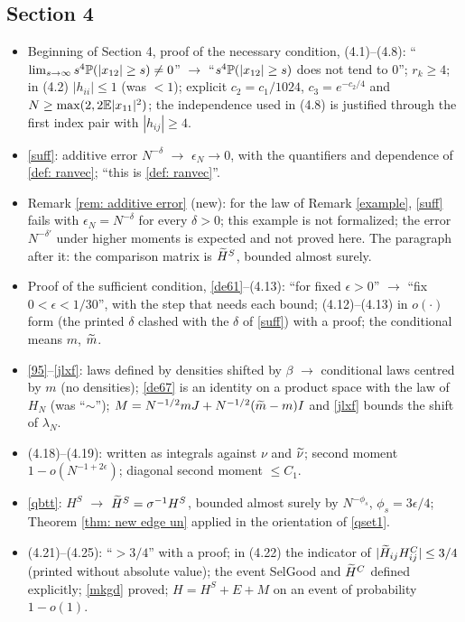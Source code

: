 \subsection*{Section 4}
\begin{itemize}
\item Beginning of Section 4, proof of the necessary condition, (4.1)--(4.8): ``$\lim_{s\to\infty}s^4\mathbb{P}(|x_{12}|\ge s)\neq0$'' $\to$ ``$s^4\mathbb{P}(|x_{12}|\ge s)$ does not tend to $0$''; $r_k\ge4$; in (4.2) $|h_{ii}|\le1$ (was $<1$); explicit $c_2=c_1/1024$, $c_3=e^{-c_2/4}$ and $N\ge\max(2,2\mathbb{E}|x_{11}|^2)$; the independence used in (4.8) is justified through the first index pair with $|h_{ij}|\ge4$.
\item \eqref{suff}: additive error $N^{-\delta}$ $\to$ $\epsilon_N\to0$, with the quantifiers and dependence of \eqref{def: ranvec}; ``this is \eqref{def: ranvec}''.
\item Remark \ref{rem: additive error} (new): for the law of Remark \ref{example}, \eqref{suff} fails with $\epsilon_N=N^{-\delta}$ for every $\delta>0$; this example is not formalized; the error $N^{-\delta'}$ under higher moments is expected and not proved here. The paragraph after it: the comparison matrix is $\widetilde H^S$, bounded almost surely.
\item Proof of the sufficient condition, \eqref{de61}--(4.13): ``for fixed $\epsilon>0$'' $\to$ ``fix $0<\epsilon<1/30$'', with the step that needs each bound; (4.12)--(4.13) in $o(\cdot)$ form (the printed $\delta$ clashed with the $\delta$ of \eqref{suff}) with a proof; the conditional means $m$, $\widetilde m$.
\item \eqref{95}--\eqref{jlxf}: laws defined by densities shifted by $\beta$ $\to$ conditional laws centred by $m$ (no densities); \eqref{de67} is an identity on a product space with the law of $H_N$ (was ``$\sim$''); $M=N^{-1/2}mJ+N^{-1/2}(\widetilde m-m)I$ and \eqref{jlxf} bounds the shift of $\lambda_N$.
\item (4.18)--(4.19): written as integrals against $\nu$ and $\widetilde\nu$; second moment $1-o(N^{-1+2\epsilon})$; diagonal second moment $\le C_1$.
\item \eqref{qbtt}: $H^S$ $\to$ $\widetilde H^S=\sigma^{-1}H^S$, bounded almost surely by $N^{-\phi_s}$, $\phi_s=3\epsilon/4$; Theorem \ref{thm: new edge un} applied in the orientation of \eqref{qset1}.
\item (4.21)--(4.25): ``$>3/4$'' with a proof; in (4.22) the indicator of $|\widetilde H_{ij}H^C_{ij}|\le3/4$ (printed without absolute value); the event SelGood and $\widetilde H^C$ defined explicitly; \eqref{mkgd} proved; $H=H^S+E+M$ on an event of probability $1-o(1)$.

\end{itemize}
